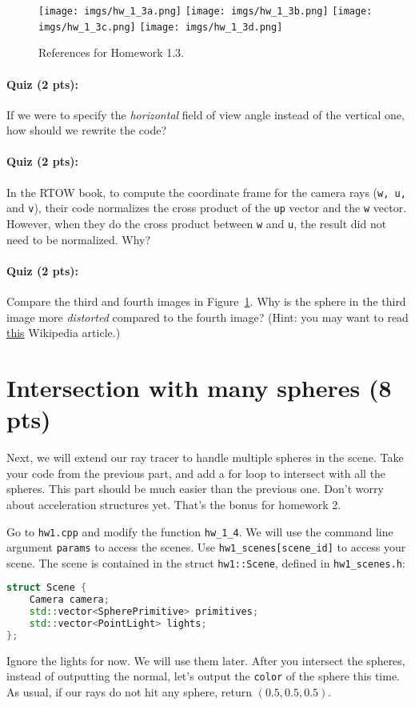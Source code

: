 \begin{figure}[ht]
    \centering
    \texttt{[image: imgs/hw\_1\_3a.png]}
    \texttt{[image: imgs/hw\_1\_3b.png]}
    \texttt{[image: imgs/hw\_1\_3c.png]}
    \texttt{[image: imgs/hw\_1\_3d.png]}
    \caption{References for Homework 1.3.}
    \label{fig:hw_1_3}
\end{figure}

\paragraph{Quiz (2 pts):} If we were to specify the \emph{horizontal} field of view angle instead of the vertical one, how should we rewrite the code?

\paragraph{Quiz (2 pts):} In the RTOW book, to compute the coordinate frame for the camera rays (\lstinline{w, u,} and \lstinline{v}), their code normalizes the cross product of the \lstinline{up} vector and the \lstinline{w} vector. However, when they do the cross product between \lstinline{w} and \lstinline{u}, the result did not need to be normalized. Why?

\paragraph{Quiz (2 pts):} Compare the third and fourth images in Figure~\ref{fig:hw_1_3}. Why is the sphere in the third image more \emph{distorted} compared to the fourth image? (Hint: you may want to read \href{https://en.wikipedia.org/wiki/Perspective_distortion}{this} Wikipedia article.)

\section{Intersection with many spheres (8 pts)}
Next, we will extend our ray tracer to handle multiple spheres in the scene. Take your code from the previous part, and add a for loop to intersect with all the spheres. This part should be much easier than the previous one. Don't worry about acceleration structures yet. That's the bonus for homework 2.

Go to \lstinline{hw1.cpp} and modify the function \lstinline{hw_1_4}. We will use the command line argument \lstinline{params} to access the scenes. Use \lstinline{hw1_scenes[scene_id]} to access your scene. The scene is contained in the struct \lstinline{hw1::Scene}, defined in \lstinline{hw1_scenes.h}:
\begin{lstlisting}[language=C++]
struct Scene {
    Camera camera;
    std::vector<SpherePrimitive> primitives;
    std::vector<PointLight> lights; 
};
\end{lstlisting}
Ignore the lights for now. We will use them later. 
After you intersect the spheres, instead of outputting the normal, let's output the \lstinline{color} of the sphere this time. As usual, if our rays do not hit any sphere, return $(0.5, 0.5, 0.5)$.

